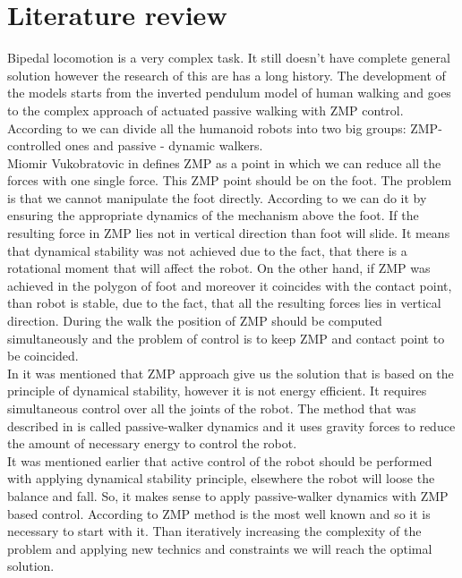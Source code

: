 \documentclass[11pt,a4paper]{article}
\begin{document}
\newpage

\section{Literature review}

Bipedal locomotion is a very complex task. It still doesn't have complete general solution however the research of this are has a long history. The development of the models starts from the inverted pendulum model of human walking and goes to the complex approach of actuated passive walking with ZMP control.\\
According to \cite{zmp_dynamic_walking} we can divide all the humanoid robots into two big groups: ZMP-controlled ones and passive - dynamic walkers.\\
Miomir Vukobratovic in \cite{zmp_vuko} defines ZMP as a point in which we can reduce all the forces with one single force. This ZMP point should be on the foot. The problem is that we cannot manipulate the foot directly. According to \cite{zmp_vuko} we can do it by ensuring the appropriate dynamics of the mechanism above the foot. If the resulting force in ZMP lies not in vertical direction than foot will slide. It means that dynamical stability was not achieved due to the fact, that there is a rotational moment that will affect the robot. On the other hand, if ZMP was achieved in the polygon of foot and moreover it coincides with the contact point, than robot is stable, due to the fact, that all the resulting forces lies in vertical direction. During the walk the position of ZMP should be computed simultaneously and the problem of control is to keep ZMP and contact point to be coincided.\\
In \cite{zmp_dynamic_walking} it was mentioned that ZMP approach give us the solution that is based on the principle of dynamical stability, however it is not energy efficient. It requires simultaneous control over all the joints of the robot. The method that was described in \cite{passive_walker} is called passive-walker dynamics and it uses gravity forces to reduce the amount of necessary energy to control the robot.\\
It was mentioned earlier that active control of the robot should be performed with applying dynamical stability principle, elsewhere the robot will loose the balance and fall. So, it makes sense to apply passive-walker dynamics with ZMP based control. According to \cite{zmp_vuko} ZMP method is the most well known and so it is necessary to start with it. Than iteratively increasing the complexity of the problem and applying new technics and constraints we will reach the optimal solution.\\
\end{document}
